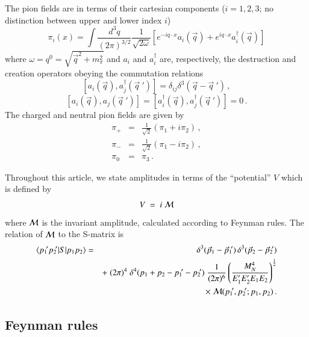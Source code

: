 \documentclass[sort&compress,preprint,3p]{elsarticle}
\begin{document}
The pion fields are in terms of their cartesian components 
($i=1,2,3$; no distinction between upper and lower index $i$)
\begin{equation}
\pi_i(x)=
\int \frac{d^3q}{(2\pi)^{3/2}} \frac{1}{\sqrt{2\omega}}
\left[ e^{-iq\cdot x}a_i(\vec q) + e^{iq\cdot x}a_i^\dagger(\vec q) \right]
\end{equation}
where $\omega=q^0=\sqrt{{\vec q}^2+m_\pi^2}$ and 
$a_i$ and $a_i^\dagger$ are, respectively, the destruction and creation
operators obeying the commutation relations
\begin{equation}
\left[a_i(\vec q),a_j^\dagger({\vec q}~') \right]
= \delta_{ij}\delta^3(\vec q - {\vec q}~')
\,,
\end{equation}
\begin{equation}
\left[a_i(\vec q),a_j({\vec q}~') \right] =
\left[a_i^\dagger(\vec q),a_j^\dagger({\vec q}~') \right] =0
\,.
\end{equation}
The charged and neutral pion fields are given by
\begin{eqnarray}
\pi_+ &=& \frac{1}{\sqrt{2}} \left(\pi_1+i\pi_2\right) \,, \\
\pi_- &=& \frac{1}{\sqrt{2}} \left(\pi_1-i\pi_2\right) \,, \\
\pi_0 &=& \pi_3 \,.
\end{eqnarray}


Throughout this article, we state amplitudes in terms of
the ``potential'' $V$ which is defined by
\begin{equation}
V \; = \; i \; {\cal M} 
\label{eq_V}
\end{equation}
where $\cal M$ is the invariant amplitude,
calculated according to Feynman rules.
The relation of $\cal M$ to the S-matrix
is
\begin{eqnarray}
\langle p_1\!' p_2\!' | S | p_1 p_2 \rangle &=&
\delta^3(\vec p_1 - \vec p_1\!') \,
\delta^3(\vec p_2 - \vec p_2\!') 
\nonumber \\ &&
 +\; (2\pi)^{4} \;
\delta^4(p_1+p_2-p_1\!'-p_2\!') \;
\frac{1}{(2\pi)^6} 
\left( \frac{M_N^4}{E_1' E_2' E_1 E_2} \right)^{\frac12}
\nonumber \\ &&
\times \; {\cal M}( p_1\!', p_2\!'; p_1, p_2 ) \,.
\label{eq_S}
\end{eqnarray}


\subsection{Feynman rules}
\end{document}
